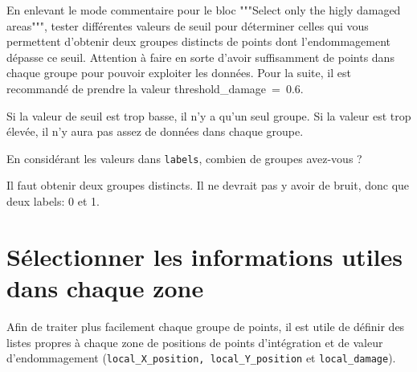 \documentclass[french,12pt]{exam}
\begin{document}
\begin{questions}
\question En enlevant le mode commentaire pour le bloc """Select only the higly damaged areas""", tester différentes valeurs de seuil pour déterminer celles qui vous permettent d'obtenir deux groupes distincts de points dont l'endommagement dépasse ce seuil. Attention à faire en sorte d'avoir suffisamment de points dans chaque groupe pour pouvoir exploiter les données. Pour la suite, il est recommandé de prendre la valeur threshold\_damage~=~0.6.
\begin{solution}
Si la valeur de seuil est trop basse, il n'y a qu'un seul groupe. Si la valeur est trop élevée, il n'y aura pas assez de données dans chaque groupe.
\end{solution}

\question En considérant les valeurs dans \texttt{labels}, combien de groupes avez-vous ?
\begin{solution}
Il faut obtenir deux groupes distincts. Il ne devrait pas y avoir de bruit, donc que deux labels: 0 et 1.
\end{solution}

\end{questions} 

\section{Sélectionner les informations utiles dans chaque zone}
Afin de traiter plus facilement chaque groupe de points, il est utile de définir des listes propres à chaque zone de positions de points d'intégration et de valeur d'endommagement (\texttt{local\_X\_position, local\_Y\_position} et \texttt{local\_damage}).\\
\end{document}
